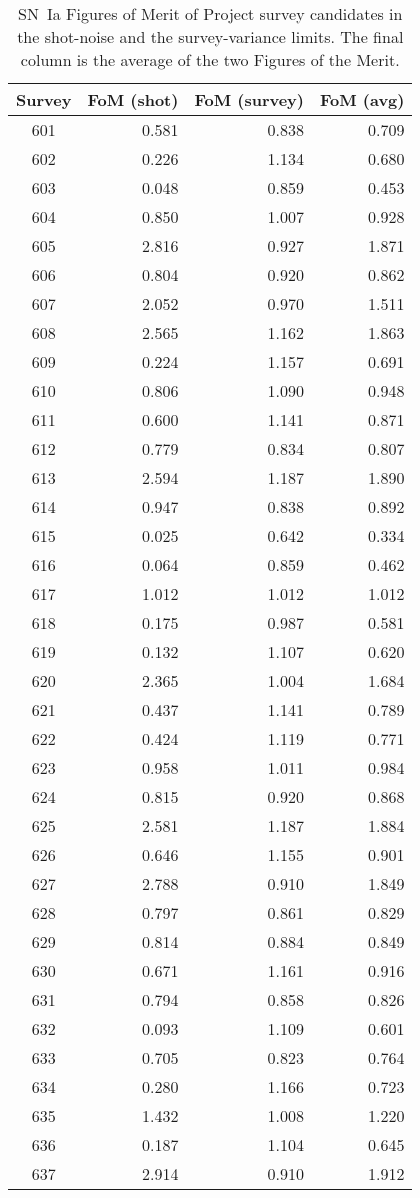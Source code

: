 \documentclass{aastex62}   	%
\begin{document}
\begin{table}
\caption{SN~Ia Figures of Merit of Project survey candidates
in  the shot-noise and the survey-variance limits.  The final column is the average
of the two Figures of the Merit.\label{table:ref}}
\centering
\begin{tabular}{|c|rrr|}
\hline
Survey & FoM (shot) & FoM (survey) & FoM (avg)\\
\hline
601  & 0.581 & 0.838 & 0.709  \\
602  & 0.226 & 1.134 & 0.680  \\
603  & 0.048 & 0.859 & 0.453  \\
604  & 0.850 & 1.007 & 0.928  \\
605  & 2.816 & 0.927 & 1.871  \\
606  & 0.804 & 0.920 & 0.862  \\
607  & 2.052 & 0.970 & 1.511  \\
608  & 2.565 & 1.162 & 1.863  \\
609  & 0.224 & 1.157 & 0.691  \\
610  & 0.806 & 1.090 & 0.948  \\
611  & 0.600 & 1.141 & 0.871  \\
612  & 0.779 & 0.834 & 0.807  \\
613  & 2.594 & 1.187 & 1.890  \\
614  & 0.947 & 0.838 & 0.892  \\
615  & 0.025 & 0.642 & 0.334  \\
616  & 0.064 & 0.859 & 0.462  \\
617  & 1.012 & 1.012 & 1.012  \\
618  & 0.175 & 0.987 & 0.581  \\
619  & 0.132 & 1.107 & 0.620  \\
620  & 2.365 & 1.004 & 1.684  \\
621  & 0.437 & 1.141 & 0.789  \\
622  & 0.424 & 1.119 & 0.771  \\
623  & 0.958 & 1.011 & 0.984  \\
624  & 0.815 & 0.920 & 0.868  \\
625  & 2.581 & 1.187 & 1.884  \\
626  & 0.646 & 1.155 & 0.901  \\
627  & 2.788 & 0.910 & 1.849  \\
628  & 0.797 & 0.861 & 0.829  \\
629  & 0.814 & 0.884 & 0.849  \\
630  & 0.671 & 1.161 & 0.916  \\
631  & 0.794 & 0.858 & 0.826  \\
632  & 0.093 & 1.109 & 0.601  \\
633  & 0.705 & 0.823 & 0.764  \\
634  & 0.280 & 1.166 & 0.723  \\
635  & 1.432 & 1.008 & 1.220  \\
636  & 0.187 & 1.104 & 0.645  \\
637  & 2.914 & 0.910 & 1.912  \\
\hline
\end{tabular}
\end{table}
\end{document}
